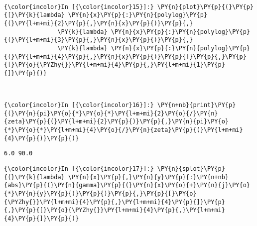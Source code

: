    \begin{center}
    \end{center}
    { \hspace*{\fill} \\}
    
    \begin{Verbatim}[commandchars=\\\{\}]
{\color{incolor}In [{\color{incolor}15}]:} \PY{n}{plot}\PY{p}{(}\PY{p}{[}\PY{k}{lambda} \PY{n}{x}\PY{p}{:}\PY{n}{polylog}\PY{p}{(}\PY{l+m+mi}{2}\PY{p}{,}\PY{n}{x}\PY{p}{)}\PY{p}{,}
               \PY{k}{lambda} \PY{n}{x}\PY{p}{:}\PY{n}{polylog}\PY{p}{(}\PY{l+m+mi}{3}\PY{p}{,}\PY{n}{x}\PY{p}{)}\PY{p}{,}
               \PY{k}{lambda} \PY{n}{x}\PY{p}{:}\PY{n}{polylog}\PY{p}{(}\PY{l+m+mi}{4}\PY{p}{,}\PY{n}{x}\PY{p}{)}\PY{p}{]}\PY{p}{,}\PY{p}{[}\PY{o}{\PYZhy{}}\PY{l+m+mi}{4}\PY{p}{,}\PY{l+m+mi}{1}\PY{p}{]}\PY{p}{)}
\end{Verbatim}

    \begin{center}
    \end{center}
    { \hspace*{\fill} \\}
    
    \begin{Verbatim}[commandchars=\\\{\}]
{\color{incolor}In [{\color{incolor}16}]:} \PY{n+nb}{print}\PY{p}{(}\PY{n}{pi}\PY{o}{*}\PY{o}{*}\PY{l+m+mi}{2}\PY{o}{/}\PY{n}{zeta}\PY{p}{(}\PY{l+m+mi}{2}\PY{p}{)}\PY{p}{,}\PY{n}{pi}\PY{o}{*}\PY{o}{*}\PY{l+m+mi}{4}\PY{o}{/}\PY{n}{zeta}\PY{p}{(}\PY{l+m+mi}{4}\PY{p}{)}\PY{p}{)}
\end{Verbatim}

    \begin{Verbatim}[commandchars=\\\{\}]
6.0 90.0

    \end{Verbatim}

    \begin{Verbatim}[commandchars=\\\{\}]
{\color{incolor}In [{\color{incolor}17}]:} \PY{n}{splot}\PY{p}{(}\PY{k}{lambda} \PY{n}{x}\PY{p}{,}\PY{n}{y}\PY{p}{:}\PY{n+nb}{abs}\PY{p}{(}\PY{n}{gamma}\PY{p}{(}\PY{n}{x}\PY{o}{+}\PY{n}{j}\PY{o}{*}\PY{n}{y}\PY{p}{)}\PY{p}{)}\PY{p}{,}\PY{p}{[}\PY{o}{\PYZhy{}}\PY{l+m+mi}{4}\PY{p}{,}\PY{l+m+mi}{4}\PY{p}{]}\PY{p}{,}\PY{p}{[}\PY{o}{\PYZhy{}}\PY{l+m+mi}{4}\PY{p}{,}\PY{l+m+mi}{4}\PY{p}{]}\PY{p}{)}
\end{Verbatim}

